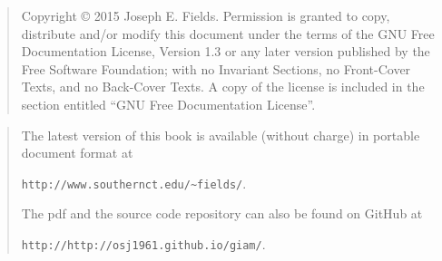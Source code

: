 \rule{0pt}{0pt}

\vfill

\begin{quote}
    Copyright \copyright{}  2015  Joseph E. Fields.
    Permission is granted to copy, distribute and/or modify this document
    under the terms of the GNU Free Documentation License, Version 1.3
    or any later version published by the Free Software Foundation;
    with no Invariant Sections, no Front-Cover Texts, and no Back-Cover Texts.
    A copy of the license is included in the section entitled ``GNU
    Free Documentation License''.
\end{quote}

\vfill

\begin{quote}
The latest version of this book is available (without charge) in portable document format at \newline
\rule{0pt}{0pt} \hspace{1in} \verb+http://www.southernct.edu/~fields/+.  

\noindent The pdf and the source code repository can also be found on GitHub at \newline
\rule{0pt}{0pt} \hspace{1in} \verb+http://http://osj1961.github.io/giam/+.  


\end{quote}

\vfill
